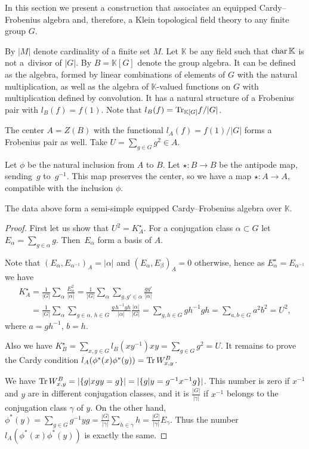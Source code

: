 \documentclass[pdftex]{sigma}
\newcommand{\tr}{\mathop{\sf tr}\nolimits}
\def \tr {{\rm Tr}\,}
\def \char {{\rm char}\,}
\begin{document}
In this section we present a construction that associates
an equipped Cardy--Frobenius algebra and, therefore, a Klein topological f\/ield
theory  to any f\/inite group $G$.



By $|M|$ denote cardinality of a f\/inite set $M$.
Let $\mathbb{K}$ be any f\/ield such that $\char \mathbb{K}$ is not a~divisor of $|G|$.
By $B = \mathbb{K}[G]$ denote the group algebra. It
can be def\/ined as the algebra, formed by linear combinations of
elements of $G$ with the natural multiplication, as well as the
algebra of $\mathbb{K}$-valued functions on $G$ with multiplication def\/ined
by convolution. It has a natural structure of a Frobenius
pair with $l_B(f) = f(1)$. Note that $l_B(f) = {\rm Tr}_{{\mathbb K}[G]} f /|G|$.

The center $A = Z(B)$ with the functional $l_A(f) = f(1)/|G|$ forms
 a Frobenius pair as well. Take $U = \sum_{g \in G} g^2 \in A$.

Let $\phi$ be the natural inclusion from $A$ to $B$.
Let  $\star: B \to B$ be the antipode map, sending~$g$ to~$g^{-1}$.
This map preserves the center, so we have a map $\star: A \to A$,
compatible with the inclusion $\phi$.

\begin{theorem}\label{HG}
The data above form a semi-simple equipped Cardy--Frobenius algebra
over ${\mathbb K}$.
\end{theorem}
\begin{proof}

First let us show that
$U^2 = K_A^\star$.
For a conjugation class $\alpha \subset G$ let
$E_\alpha = \sum_{g \in \alpha} g$. Then~$E_\alpha$ form a basis of $A$.

Note that
$(E_\alpha,E_{\alpha^{-1}})_A = |\alpha|$
and $(E_\alpha, E_\beta)_A = 0$ otherwise, hence as $E_\alpha^\star = E_{\alpha^{-1}}$ we have
\begin{gather*}
K_A^\star = \frac{1}{|G|}\sum_\alpha \frac{E_\alpha^2}{|\alpha|} =
\frac{1}{|G|}\sum_\alpha \sum_{g,g' \in \alpha} \frac{g g'}{|\alpha|} \\
\phantom{K_A^\star}{}  = \frac{1}{|G|}\sum_\alpha \sum_{g \in \alpha, \, h \in G} \frac{g \, h^{-1} gh}{|\alpha|}\frac{|\alpha|}{|G|} =
\sum_{g,h \in G} g h^{-1} gh = \sum_{a,b \in G} a^2 b^2 = U^2,
\end{gather*}
where $a = gh^{-1}$, $b = h$.


Also we have $K_B^\star = \sum_{x,y \in G} l_B(x y^{-1}) xy =  \sum_{g \in G} g^2 = U$.
It remains to prove the Cardy condition  $l_A(\phi^*(x)\phi^*(y)) =\tr W^B_{x,y}$.

We have $\tr W^B_{x,y} = |\{g | xgy = g\}| = |\{g | y = g^{-1}x^{-1} g\}|$.
This number is zero if $x^{-1}$ and $y$ are in dif\/ferent conjugation classes,
and it is $\frac{|G|}{|\gamma|}$ if $x^{-1}$  belongs to the conjugation class $\gamma$ of $y$.
On the other hand, $\phi^*(y) = \sum_{g \in G} g^{-1} y g  =
\frac{|G|}{|\gamma|}\sum_{h \in \gamma} h = \frac{|G|}{|\gamma|}
E_\gamma$.
Thus the number $l_A(\phi^*(x)\phi^*(y))$  is exactly the same.
\end{proof}
\end{document}
